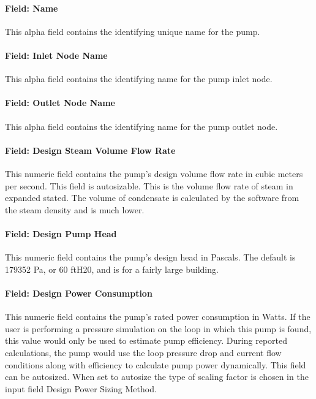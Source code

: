 \paragraph{Field: Name}\label{field-name-2-030}

This alpha field contains the identifying unique name for the pump.

\paragraph{Field: Inlet Node Name}\label{field-inlet-node-name-2-001}

This alpha field contains the identifying name for the pump inlet node.

\paragraph{Field: Outlet Node Name}\label{field-outlet-node-name-2-001}

This alpha field contains the identifying name for the pump outlet node.

\paragraph{Field: Design Steam Volume Flow Rate}\label{field-design-steam-volume-flow-rate}

This numeric field contains the pump's design volume flow rate in cubic meters per second. This field is autosizable. This is the volume flow rate of steam in expanded stated. The volume of condensate is calculated by the software from the steam density and is much lower.

\paragraph{Field: Design Pump Head}\label{field-design-pump-head-2}

This numeric field contains the pump's design head in Pascals. The default is 179352 Pa, or 60 ftH20, and is for a fairly large building.

\paragraph{Field: Design Power Consumption}\label{field-design-power-consumption-2}

This numeric field contains the pump's rated power consumption in Watts. If the user is performing a pressure simulation on the loop in which this pump is found, this value would only be used to estimate pump efficiency. During reported calculations, the pump would use the loop pressure drop and current flow conditions along with efficiency to calculate pump power dynamically. This field can be autosized. When set to autosize the type of scaling factor is chosen in the input field Design Power Sizing Method.

